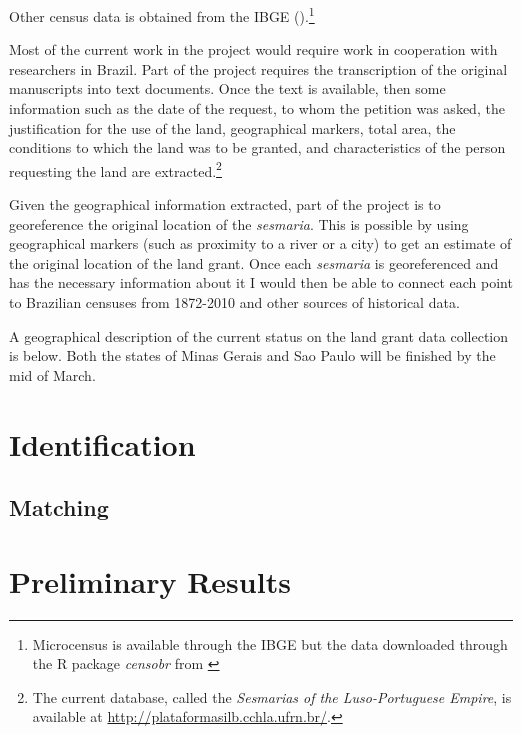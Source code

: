 \documentclass{article}
\begin{document}
Other census data is obtained from the IBGE (\textit{}).\footnote{Microcensus is available through the IBGE but the data downloaded through the R package \textit{censobr} from \textcite{Pereira2023-qv}}

Most of the current work in the project would require work in cooperation with researchers in Brazil. 
Part of the project requires the transcription of the original manuscripts into text documents.
Once the text is available, then some information such as the date of the request, to whom the petition was asked, the justification for the use of the land, geographical markers, total area, the conditions to which the land was to be granted, and characteristics of the person requesting the land are extracted.\footnote{The current database, called the \textit{Sesmarias of the Luso-Portuguese Empire}, is available at \url{http://plataformasilb.cchla.ufrn.br/}.} 

Given the geographical information extracted, part of the project is to georeference the original location of the \textit{sesmaria}. This is possible by using geographical markers (such as proximity to a river or a city) to get an estimate of the original location of the land grant.
Once each \textit{sesmaria} is georeferenced and has the necessary information about it I would then be able to connect each point to Brazilian censuses from 1872-2010 and other sources of historical data.

A geographical description of the current status on the land grant data collection is below. Both the states of Minas Gerais and Sao Paulo will be finished by the mid of March.



\section{Identification}

\subsection{Matching}

\parencite{}

\section{Preliminary Results}

\newpage


\printbibliography

\appendix
\end{document}
